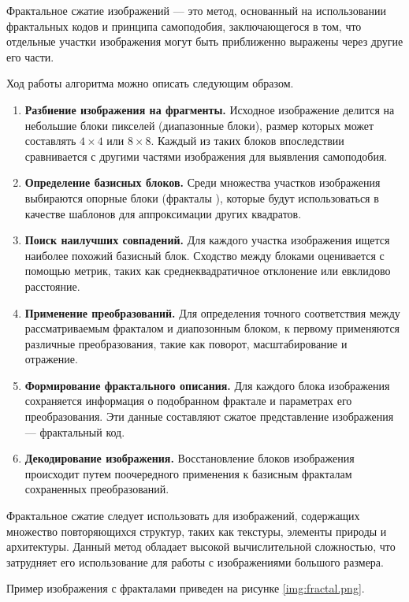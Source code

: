 Фрактальное сжатие изображений \cite{FractalCompression} --- это метод, основанный на использовании фрактальных кодов и принципа самоподобия, заключающегося в том, что отдельные участки изображения могут быть приближенно выражены через другие его части.

Ход работы алгоритма можно описать следующим образом.
\begin{enumerate}
    \item \textbf{Разбиение изображения на фрагменты.} Исходное изображение делится на небольшие блоки пикселей (диапазонные блоки), размер которых может составлять $4 \times 4$ или $8 \times 8$. Каждый из таких блоков впоследствии сравнивается с другими частями изображения для выявления самоподобия.
    \item \textbf{Определение базисных блоков.} Среди множества участков изображения выбираются опорные блоки (фракталы \cite{Fractal}), которые будут использоваться в качестве шаблонов для аппроксимации других квадратов.
    \item \textbf{Поиск наилучших совпадений.} Для каждого участка изображения ищется наиболее похожий базисный блок. Сходство между блоками оценивается с помощью метрик, таких как среднеквадратичное отклонение или евклидово расстояние.
    \item \textbf{Применение преобразований.} Для определения точного соответствия между рассматриваемым фракталом и диапозонным блоком, к первому применяются различные преобразования, такие как поворот, масштабирование и отражение. 
    \item \textbf{Формирование фрактального описания.} Для каждого блока изображения сохраняется информация о подобранном фрактале и параметрах его преобразования. Эти данные составляют сжатое представление изображения --- фрактальный код.
    \item \textbf{Декодирование изображения.} Восстановление блоков изображения происходит путем поочередного применения к базисным фракталам сохраненных преобразований.
\end{enumerate}

Фрактальное сжатие следует использовать для изображений, содержащих множество повторяющихся структур, таких как текстуры, элементы природы и архитектуры. Данный метод обладает высокой вычислительной сложностью, что затрудняет его использование для работы с изображениями большого размера.

Пример изображения с фракталами приведен на рисунке \ref{img:fractal.png}.

